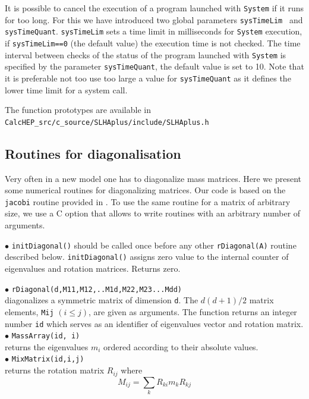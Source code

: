 \documentclass[12pt,a4paper]{article}
\begin{document}
It is possible to cancel the execution of a program launched with  \verb|System|  if it runs for too long. For this we have introduced two
global parameters  {\tt  sysTimeLim } and {\tt  sysTimeQuant}.
{\tt  sysTimeLim} sets a time limit  in milliseconds for {\tt System} execution, if 
{\tt  sysTimeLim==0} (the default value) the execution time is not checked. 
The time interval between checks of the status of the program launched with  \verb|System|  is specified by the parameter
{\tt sysTimeQuant}, the default value is set to 10.  
Note that it is preferable not too use too large a value for {\tt sysTimeQuant} as it defines the lower time limit for a system call. 



The  function prototypes are available  in \\
\verb|CalcHEP_src/c_source/SLHAplus/include/SLHAplus.h|

\subsection{Routines for diagonalisation}

Very often in a new model  one has to diagonalize 
mass matrices. Here we present some numerical routines for 
diagonalizing matrices. Our code is based on the \verb|jacobi| routine provided in 
 \cite{Numerical}. To use the same routine for a matrix of arbitrary size, we 
use a C option that allows to write routines with an arbitrary number of arguments. 

\noindent 
$\bullet$ \verb|initDiagonal()| should be called once  before any other 
\verb|rDiagonal(A)| routine described below. \verb|initDiagonal()| assigns zero value 
to the internal counter of  eigenvalues and rotation matrices. Returns zero.

\noindent
$\bullet$ \verb|rDiagonal(d,M11,M12,..M1d,M22,M23...Mdd)|\\
diagonalizes a symmetric matrix of dimension \verb|d|. The  
$d(d+1)/2$  matrix elements, \verb|Mij| $(i\le j)$, are given as arguments.
The function returns an integer number \verb|id| which serves as an  identifier 
of eigenvalues vector and rotation matrix.\\
\noindent
$\bullet$ \verb|MassArray(id, i)|\\ returns the eigenvalues  $m_i$ ordered according to 
their absolute values. \\
\noindent
$\bullet$ \verb|MixMatrix(id,i,j)|\\ returns the rotation matrix  $R_{ij}$ where
$$  M_{ij} = \sum\limits_k  R_{ki} m_k R_{kj}$$
\end{document}
